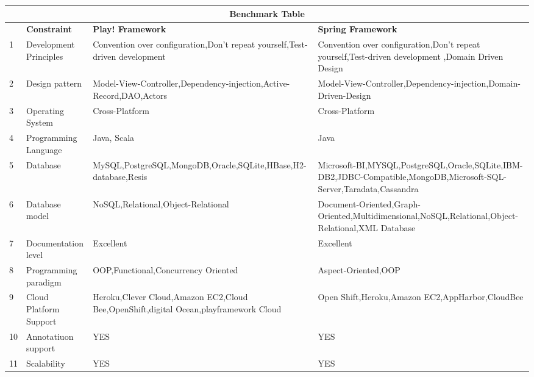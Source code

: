 \begin{center}
	

\begin{tabular}{ |l||l|p{7cm}|p{6cm}|  }
 \hline
 \multicolumn{4}{|c|}{\textbf{Benchmark Table}} \\
 \hline
 ~ & \textbf{Constraint} & \textbf{Play! Framework} & \textbf{Spring Framework}\\
 \hline
 1   & Development Principles & Convention over configuration,Don't repeat yourself,Test-driven development & Convention over configuration,Don't repeat yourself,Test-driven development ,Domain Driven Design   \\
 \hline
 2 & Design pattern & Model-View-Controller,Dependency-injection,Active-Record,DAO,Actors & Model-View-Controller,Dependency-injection,Domain-Driven-Design \\
 \hline
 3 &Operating System & Cross-Platform&  Cross-Platform\\
 \hline
 4 &Programming Language & Java, Scala &  Java\\
 \hline
 5& Database  & MySQL,PostgreSQL,MongoDB,Oracle,SQLite,HBase,H2-database,Resis& Microsoft-BI,MYSQL,PostgreSQL,Oracle,SQLite,IBM-DB2,JDBC-Compatible,MongoDB,Microsoft-SQL-Server,Taradata,Cassandra\\
 \hline
 6&   Database model  & NoSQL,Relational,Object-Relational & Document-Oriented,Graph-Oriented,Multidimensional,NoSQL,Relational,Object-Relational,XML Database\\
 \hline
 7&   Documentation level & Excellent&Excellent\\
 \hline
 8&   Programming paradigm  & OOP,Functional,Concurrency Oriented&Aspect-Oriented,OOP\\
 \hline
 9&   Cloud Platform Support  & Heroku,Clever Cloud,Amazon EC2,Cloud Bee,OpenShift,digital Ocean,playframework Cloud & Open Shift,Heroku,Amazon EC2,AppHarbor,CloudBee\\
 \hline
 10&   Annotatiuon support & YES & YES\\
 \hline
 11&   Scalability & YES&YES\\
 \hline
\end{tabular}
\end{center}




